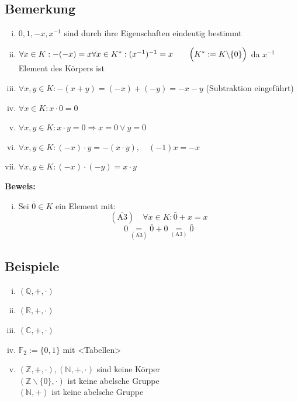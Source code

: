 \subsection{Bemerkung}
\begin{enumerate}[(i)]
\item \(0, 1, -x, x^{-1}\) sind durch ihre Eigenschaften eindeutig bestimmt

\item 
\(
\forall x \in K : -(-x)=x \\
\forall x \in K^{*} : (x^{-1})^{-1}=x \quad \quad \Big( K^* := K\backslash\{0\} \Big) 
\) da \(x^{-1}\)  Element des Körpers ist

\item 
\(
\forall x,y \in K : -(x+y)=(-x)+(-y) = -x- y
\)
(Subtraktion eingeführt)

\item 
\(
\forall x \in K : x \cdot 0 = 0
\)

\item
\(
\forall x,y \in K : x \cdot y = 0 \Longrightarrow x=0 \vee y=0
\)

\item
\(
\forall x,y \in K : (-x) \cdot y = -(x \cdot y), \quad (-1) x = -x
\)

\item
\(
\forall x,y \in K : (-x) \cdot (-y) = x \cdot y
\)
\end{enumerate}
\textbf{Beweis:}
\begin{enumerate}[(i)]
\item Sei \( \bar 0 \in K\) ein Element mit:
\[
(\overline{\text{A3}}) \quad \forall x \in K : \bar 0 +x=x \]
\[
0 \underset{(\overline{\text{A3}})}=\bar 0 + 0 \underset{(\text{A3})}= \bar 0
\]
\end{enumerate}

\subsection{Beispiele}
\begin{enumerate}[(i)]
\item \( (\mathds{Q},+, \cdot )\)
\item \( (\mathds{R},+,\cdot)\)
\item \( (\mathds{C},+,\cdot)\)
\item \( \mathds{F}_2 := \{0,1\}\) mit <Tabellen>
\item \((\mathds{Z},+, \cdot ), (\mathds{N},+, \cdot)\) sind keine Körper \\
\((\mathds{Z}\backslash \{0\}, \cdot )\) ist keine abelsche Gruppe \\
\((\mathds{N},+)\) ist keine abelsche Gruppe
\end{enumerate}

